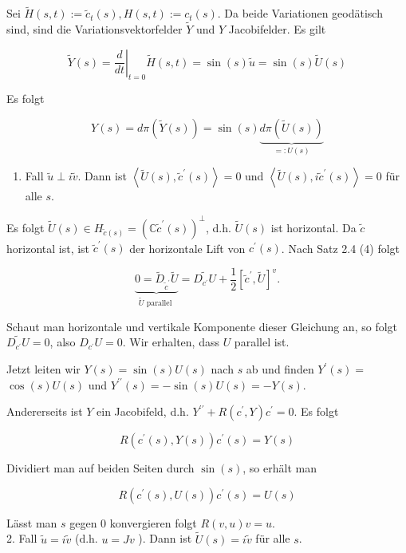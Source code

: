 \documentclass[10pt]{article}
\begin{document}
Sei $\tilde{H}(s, t):=\tilde{c}_{t}(s), H(s, t):=c_{t}(s)$. Da beide Variationen geodätisch sind, sind die Variationsvektorfelder $\tilde{Y}$ und $Y$ Jacobifelder. Es gilt

$$
\tilde{Y}(s)=\left.\frac{d}{d t}\right|_{t=0} \tilde{H}(s, t)=\sin (s) \tilde{u}=\sin (s) \tilde{U}(s)
$$

Es folgt


\begin{equation*}
Y(s)=d \pi(\tilde{Y}(s))=\sin (s) \underbrace{d \pi(\tilde{U}(s))}_{=: U(s)} \tag{9}
\end{equation*}


\begin{enumerate}
  \item Fall $\tilde{u} \perp i \tilde{v}$. Dann ist $\left\langle\tilde{U}(s), \tilde{c}^{\prime}(s)\right\rangle=0$ und $\left\langle\tilde{U}(s), i \tilde{c}^{\prime}(s)\right\rangle=0$ für alle $s$.
\end{enumerate}

Es folgt $\tilde{U}(s) \in H_{\tilde{c}(s)}=\left(\mathbb{C} \tilde{c}^{\prime}(s)\right)^{\perp}$, d.h. $\tilde{U}(s)$ ist horizontal. Da $\tilde{c}$ horizontal ist, ist $\tilde{c}^{\prime}(s)$ der horizontale Lift von $c^{\prime}(s)$. Nach Satz 2.4 (4) folgt

$$
\underbrace{0=\tilde{D}_{\tilde{c}^{\prime}} \tilde{U}}_{\tilde{U} \text { parallel }}=\widetilde{D_{c^{\prime}} U}+\frac{1}{2}\left[\tilde{c}^{\prime}, \tilde{U}\right]^{v} .
$$

Schaut man horizontale und vertikale Komponente dieser Gleichung an, so folgt $\widetilde{D_{c^{\prime}} U}=0$, also $D_{c^{\prime}} U=0$. Wir erhalten, dass $U$ parallel ist.

Jetzt leiten wir $Y(s)=\sin (s) U(s)$ nach $s$ ab und finden $Y^{\prime}(s)=$ $\cos (s) U(s)$ und $Y^{\prime \prime}(s)=-\sin (s) U(s)=-Y(s)$.

Andererseits ist $Y$ ein Jacobifeld, d.h. $Y^{\prime \prime}+R\left(c^{\prime}, Y\right) c^{\prime}=0$. Es folgt

$$
R\left(c^{\prime}(s), Y(s)\right) c^{\prime}(s)=Y(s)
$$

Dividiert man auf beiden Seiten durch $\sin (s)$, so erhält man

$$
R\left(c^{\prime}(s), U(s)\right) c^{\prime}(s)=U(s)
$$

Lässt man $s$ gegen 0 konvergieren folgt $R(v, u) v=u$.\\
2. Fall $\tilde{u}=i \tilde{v}$ (d.h. $u=J v$ ). Dann ist $\tilde{U}(s)=i \tilde{v}$ für alle $s$.
\end{document}
